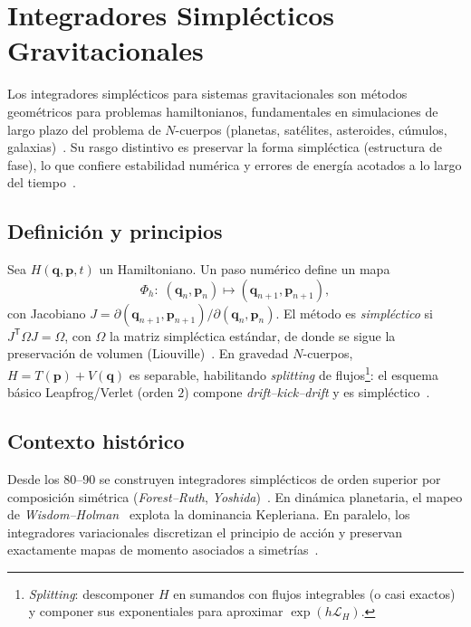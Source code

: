 \section[Integradores Simplécticos]{Integradores Simplécticos Gravitacionales}%
\label{sec:IntegradoresSimplecticos}

Los integradores simplécticos para sistemas gravitacionales son métodos geométricos para problemas hamiltonianos, fundamentales en simulaciones de largo plazo del problema de $N$-cuerpos (planetas, satélites, asteroides, cúmulos, galaxias)~\cite{wisdom1991, stuchi2002, chin2005, hernandez2020}. Su rasgo distintivo es preservar la forma simpléctica (estructura de fase), lo que confiere estabilidad numérica y errores de energía acotados a lo largo del tiempo~\cite{stuchi2002, farr2007, yoshida1993}.

\subsection{Definición y principios}
Sea $H(\mathbf{q},\mathbf{p},t)$ un Hamiltoniano. Un paso numérico define un mapa
\[
\Phi_h:\;(\mathbf{q}_n,\mathbf{p}_n)\mapsto(\mathbf{q}_{n+1},\mathbf{p}_{n+1}),
\]
con Jacobiano $J=\partial(\mathbf{q}_{n+1},\mathbf{p}_{n+1})/\partial(\mathbf{q}_n,\mathbf{p}_n)$. El método es \emph{simpléctico} si $J^{\mathsf T}\Omega J=\Omega$, con $\Omega$ la matriz simpléctica estándar, de donde se sigue la preservación de volumen (Liouville)~\cite{farr2007, yoshida1993}. En gravedad $N$-cuerpos, $H=T(\mathbf{p})+V(\mathbf{q})$ es separable, habilitando \emph{splitting} de flujos\footnote{%
\emph{Splitting}: descomponer $H$ en sumandos con flujos integrables (o casi exactos) y componer sus exponentiales para aproximar $\exp(h \mathcal{L}_H)$.}:
el esquema básico Leapfrog/Verlet (orden $2$) compone \emph{drift–kick–drift} y es simpléctico~\cite{stuchi2002, farr2007, Hernandez2015}.

\subsection{Contexto histórico}
Desde los 80–90 se construyen integradores simplécticos de orden superior por composición simétrica (\emph{Forest–Ruth}, \emph{Yoshida})~\cite{yoshida1990, yoshida1993, farr2007}. En dinámica planetaria, el mapeo de \emph{Wisdom–Holman}~\cite{wisdom1991} explota la dominancia Kepleriana. En paralelo, los integradores variacionales discretizan el principio de acción y preservan exactamente mapas de momento asociados a simetrías~\cite{farr2007, Hernandez2015}.

